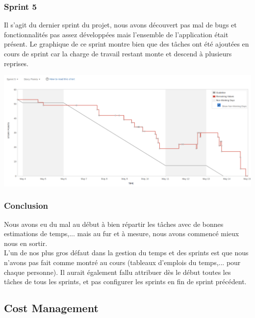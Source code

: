 \documentclass[t, 12pt, usenames,dvipsnames]{article}
\begin{document}
        
            \subsubsection{Sprint 5}
                \noindent Il s'agit du dernier sprint du projet, nous avons découvert pas mal de bugs et fonctionnalités pas assez développées mais l'ensemble de l'application était présent. Le graphique de ce sprint montre bien que des tâches ont été ajoutées en cours de sprint car la charge de travail restant monte et descend à plusieurs reprises. 
                
                \begin{center}
                    \includegraphics[scale=.25]{images/graph-new/sprint5.png}
                    \label{fig:sprint5_graph}
                \end{center}
                
                
           \subsubsection{Conclusion} 
               \noindent Nous avons eu du mal au début à bien répartir les tâches avec de bonnes estimations de temps,... mais au fur et à mesure, nous avons commencé mieux nous en sortir. \\
                L'un de nos plus gros défaut dans la gestion du temps et des sprints est que nous n'avons pas fait comme montré au cours (tableaux d'emplois du temps,... pour chaque personne). Il aurait également fallu attribuer dès le début toutes les tâches de tous les sprints, et pas configurer les sprints en fin de sprint précédent. 
                
        
        \subsection{Cost Management}
    
\end{document}
